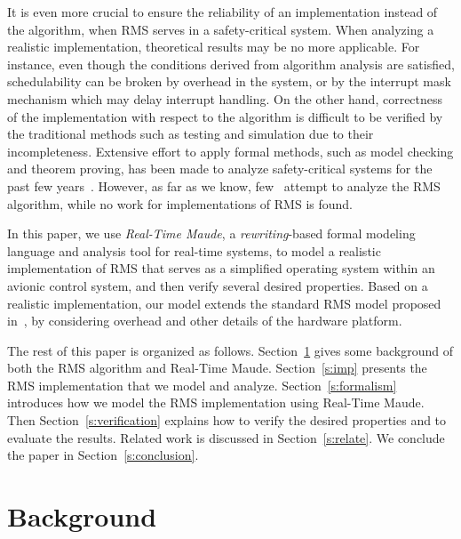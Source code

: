 \documentclass[10pt,journal]{IEEEtran}
\begin{document}
{It is even more crucial to ensure the reliability of an implementation
instead of the algorithm, when RMS serves in a safety-critical
system. When analyzing a realistic implementation, theoretical results
may be no more applicable. For instance, even though the conditions
derived from algorithm analysis are satisfied, schedulability can be
broken by overhead in the system, or by the interrupt mask mechanism
which may delay interrupt handling. On the other hand, correctness of
the implementation with respect to the algorithm is difficult to be
verified by the traditional methods such as testing and simulation due
to their incompleteness. Extensive effort to apply formal methods,
such as model checking and theorem proving, has been made to analyze
safety-critical systems for the past few
years~\cite{DBLP:journals/tie/MiyawakiMSYV05,DBLP:journals/iandc/MeseguerR13,DBLP:journals/cacm/Leroy09,DBLP:conf/sosp/KleinEHACDEEKNSTW09}. However,
as far as we know, few~\cite{DBLP:conf/iceccs/CuiDT14,TianD2011}
attempt to analyze the RMS algorithm, while no work for
implementations of RMS is found.

In this paper, we use \emph{Real-Time Maude}, a \emph{rewriting}-based
formal modeling language and analysis tool for real-time systems, to
model a realistic implementation of RMS that serves as a simplified
operating system within an avionic control system, and then verify
several desired properties. Based on a realistic implementation, our
model extends the standard RMS model proposed
in~\cite{DBLP:journals/jacm/LiuL73}, by considering overhead and other
details of the hardware platform.

The rest of this paper is organized as
follows. Section~\ref{s:background} gives some background of both the
RMS algorithm and Real-Time Maude.  Section~\ref{s:imp} presents the
RMS implementation that we model and analyze.
Section~\ref{s:formalism} introduces how we model the RMS
implementation using Real-Time Maude. Then
Section~\ref{s:verification} explains how to verify the desired
properties and to evaluate the results. Related work is discussed in
Section~\ref{s:relate}. We conclude the paper in
Section~\ref{s:conclusion}.

\section{Background}
\label{s:background}

}
\end{document}
